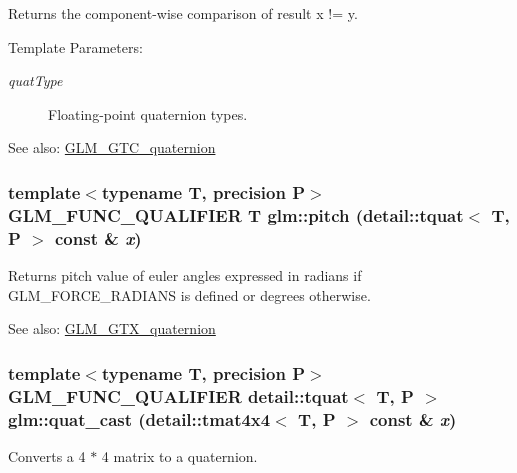 Returns the component-wise comparison of result x != y.

\begin{Desc}
\item[Template Parameters:]
\begin{description}
\item[{\em quatType}]Floating-point quaternion types.\end{description}
\end{Desc}
\begin{Desc}
\item[See also:]\hyperlink{group__gtc__quaternion}{GLM\_\-GTC\_\-quaternion} \end{Desc}
\hypertarget{group__gtc__quaternion_g091250a9d0674463c4c9342563184bcd}{
\subsubsection[pitch]{\setlength{\rightskip}{0pt plus 5cm}template$<$typename T, precision P$>$ GLM\_\-FUNC\_\-QUALIFIER T glm::pitch (detail::tquat$<$ T, P $>$ const \& {\em x})}}
\label{group__gtc__quaternion_g091250a9d0674463c4c9342563184bcd}


Returns pitch value of euler angles expressed in radians if GLM\_\-FORCE\_\-RADIANS is defined or degrees otherwise.

\begin{Desc}
\item[See also:]\hyperlink{group__gtx__quaternion}{GLM\_\-GTX\_\-quaternion} \end{Desc}
\hypertarget{group__gtc__quaternion_ge2011ef54746786bc5a93314dfcf54b5}{
\subsubsection[quat\_\-cast]{\setlength{\rightskip}{0pt plus 5cm}template$<$typename T, precision P$>$ GLM\_\-FUNC\_\-QUALIFIER detail::tquat$<$ T, P $>$ glm::quat\_\-cast (detail::tmat4x4$<$ T, P $>$ const \& {\em x})}}
\label{group__gtc__quaternion_ge2011ef54746786bc5a93314dfcf54b5}


Converts a 4 $\ast$ 4 matrix to a quaternion.

